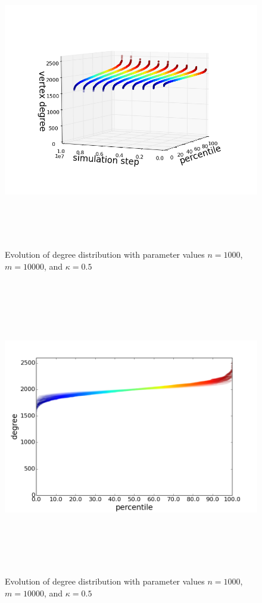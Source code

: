 \documentclass[11pt]{article}
\begin{document}
\begin{figure}[h!]
  \centering
  \includegraphics[height=130mm]{n_1000_short_3d}
  \caption{Evolution of degree distribution with parameter values $n=1000$, $m=10000$, and $\kappa=0.5$}
  \label{fig:1000s3}
\end{figure}
\begin{figure}[h!]
  \centering
  \includegraphics[height=130mm]{n_1000_short_time}
  \caption{Evolution of degree distribution with parameter values $n=1000$, $m=10000$, and $\kappa=0.5$}
  \label{fig:1000st}
\end{figure}
\end{document}
